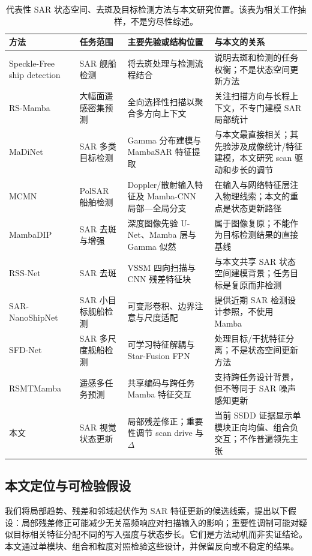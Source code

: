 \documentclass[UTF8,12pt,a4paper]{ctexart}
\begin{document}
\begin{table}[H]\centering\scriptsize
\caption{代表性 SAR 状态空间、去斑及目标检测方法与本文研究位置。该表为相关工作抽样，不是穷尽性综述。}
\label{tab:related_position}
\begin{tabularx}{\linewidth}{p{3.2cm}p{2.25cm}p{3.7cm}X}
\toprule
方法 & 任务范围 & 主要先验或结构位置 & 与本文的关系\\
\midrule
Speckle-Free ship detection\cite{specklefree} & SAR 舰船检测 & 将去斑处理与检测流程结合 & 说明去斑和检测的任务权衡；不是状态空间更新方法\\
RS-Mamba\cite{rs_mamba} & 大幅面遥感密集预测 & 全向选择性扫描以聚合多方向上下文 & 关注扫描方向与长程上下文，不专门建模 SAR 局部统计\\
MaDiNet\cite{madinet} & SAR 多类目标检测 & Gamma 分布建模与 MambaSAR 特征提取 & 与本文最直接相关；其先验涉及成像统计/特征建模，本文研究 scan 驱动和步长的调节\\
MCMN\cite{mcmn} & PolSAR 船舶检测 & Doppler/散射输入特征及 Mamba-CNN 局部—全局分支 & 在输入与网络特征层注入物理线索；本文的重点是状态更新路径\\
MambaDIP\cite{mambadip} & SAR 去斑与增强 & 深度图像先验 U-Net、Mamba 层与 Gamma 似然 & 属于图像复原；不能作为目标检测结果的直接基线\\
RSS-Net\cite{rssnet} & SAR 去斑 & VSSM 四向扫描与 CNN 残差特征块 & 与本文共享 SAR 状态空间建模背景；任务目标是复原而非检测\\
SAR-NanoShipNet\cite{sarnano} & SAR 小目标舰船检测 & 可变形卷积、边界注意与尺度适配 & 提供近期 SAR 检测设计参照，不使用 Mamba\\
SFD-Net\cite{sfdnet} & SAR 多尺度舰船检测 & 可学习特征解耦与 Star-Fusion FPN & 处理目标/干扰特征分离；不是状态空间更新方法\\
RSMTMamba\cite{rstmtmamba} & 遥感多任务预测 & 共享编码与跨任务 Mamba 特征交互 & 支持跨任务设计背景，但不等同于 SAR 噪声感知更新\\
本文 & SAR 视觉状态更新 & 局部残差修正；重要性调节 scan drive 与 $\Delta$ & 当前 SSDD 证据显示单模块正向均值、组合负交互；不作普遍领先主张\\
\bottomrule
\end{tabularx}
\end{table}

\subsection{本文定位与可检验假设}
我们将局部趋势、残差和邻域起伏作为 SAR 特征更新的候选线索，提出以下假设：局部残差修正可能减少无关高频响应对扫描输入的影响；重要性调制可能对疑似目标相关特征分配不同的写入强度与状态步长。它们是方法动机而非实证结论。本文通过单模块、组合和粒度对照检验这些设计，并保留反向或不稳定的结果。
\end{document}
